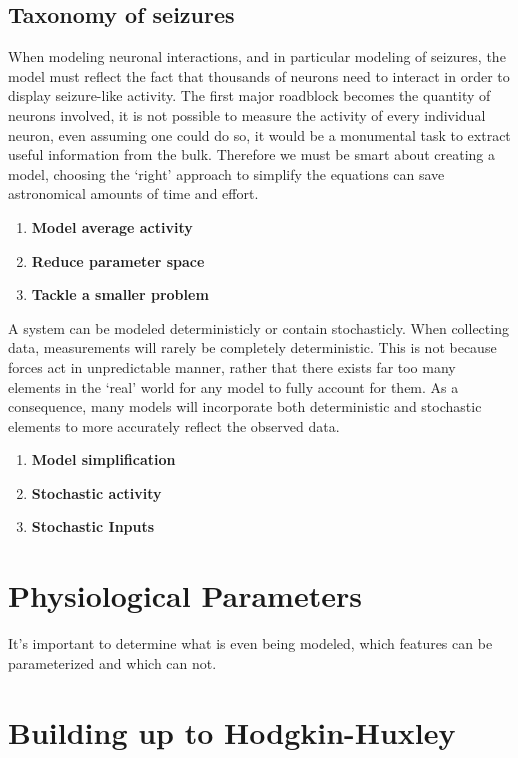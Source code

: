 \documentclass[../../Orator.tex]{subfiles}
\begin{document}
\subsection*{Taxonomy of seizures}


When modeling neuronal interactions, and in particular modeling of seizures, the model must reflect the fact that thousands of neurons need to interact in order to display seizure-like activity. 
The first major roadblock becomes the quantity of neurons involved, it is not possible to measure the activity of every individual neuron, even assuming one could do so, it would be a monumental task to extract useful information from the bulk. 
Therefore we must be smart about creating a model, choosing the `right' approach to simplify the equations can save astronomical amounts of time and effort.
\begin{enumerate}
    \item \textbf{Model average activity}
    \item \textbf{Reduce parameter space}
    \item \textbf{Tackle a smaller problem}
\end{enumerate}


A system can be modeled deterministicly or contain stochasticly. When collecting data, measurements will rarely be completely deterministic. This is not because forces act in unpredictable manner, rather that there exists far too many elements in the `real' world for any model to fully account for them. 
As a consequence, many models will incorporate both deterministic and stochastic elements to more accurately reflect the observed data.
\begin{enumerate}
    \item \textbf{Model simplification}
    \item \textbf{Stochastic activity}
    \item \textbf{Stochastic Inputs}
\end{enumerate}



\newpage
\section{Physiological Parameters}
It's important to determine what is even being modeled, which features can be parameterized and which can not.


\newpage
\section{Building up to Hodgkin-Huxley}
\end{document}
